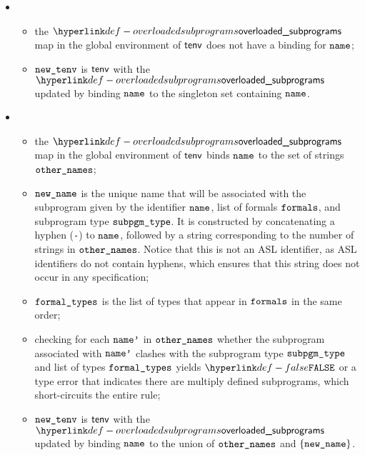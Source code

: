 \ProseParagraph
\OneApplies
\begin{itemize}
  \item {}
  \begin{itemize}
    \item the $\overloadedsubprograms$ map in the global environment of $\tenv$ does not have a binding for $\name$;
    \item $\newtenv$ is $\tenv$ with the $\overloadedsubprograms$ updated by binding $\name$ to the singleton set containing
          $\name$.
  \end{itemize}

  \item {}
  \begin{itemize}
    \item the $\overloadedsubprograms$ map in the global environment of $\tenv$ binds $\name$ to the set of strings $\othernames$;
    \item $\newname$ is the unique name that will be associated with the subprogram given by the identifier $\name$, list of formals $\formals$,
          and subprogram type $\subpgmtype$. It is constructed by concatenating a hyphen (\texttt{-}) to $\name$, followed
          by a string corresponding to the number of strings in $\othernames$.
          Notice that this is not an ASL identifier, as ASL identifiers do not contain hyphens, which ensures that this string
          does not occur in any specification;
    \item $\formaltypes$ is the list of types that appear in $\formals$ in the same order;
    \item checking for each $\namep$ in $\othernames$ whether the subprogram associated with $\namep$ clashes
          with the subprogram type $\subpgmtype$ and list of types $\formaltypes$ yields $\False$
          or a type error that indicates there are multiply defined subprograms, which short-circuits the entire rule;
    \item $\newtenv$ is $\tenv$ with the $\overloadedsubprograms$ updated by binding $\name$ to the union of $\othernames$ and
          $\{\newname\}$.
  \end{itemize}
\end{itemize}
\FormallyParagraph
\begin{mathpar}
\end{mathpar}

